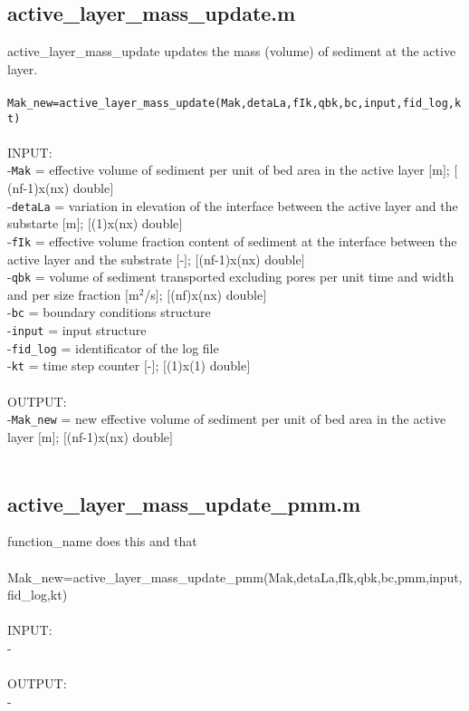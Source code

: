\subsection{active\_layer\_mass\_update.m}
active\_layer\_mass\_update updates the mass (volume) of sediment at the active layer. \\ 
 \\ 
\texttt{Mak\_new=active\_layer\_mass\_update(Mak,detaLa,fIk,qbk,bc,input,fid\_log,kt)} \\ 
 \\ 
INPUT: \\ 
   -\texttt{Mak} = effective volume of sediment per unit of bed area in the active layer $[$m$]$; $[$(nf-1)x(nx) double$]$ \\ 
   -\texttt{detaLa} = variation in elevation of the interface between the active layer and the substarte $[$m$]$; $[$(1)x(nx) double$]$ \\ 
   -\texttt{fIk} = effective volume fraction content of sediment at the interface between the active layer and the substrate $[$-$]$; $[$(nf-1)x(nx) double$]$ \\ 
   -\texttt{qbk} = volume of sediment transported excluding pores per unit time and width and per size fraction $[$m$^2$/s$]$; $[$(nf)x(nx) double$]$ \\ 
   -\texttt{bc} = boundary conditions structure  \\ 
   -\texttt{input} = input structure \\ 
   -\texttt{fid\_log} = identificator of the log file \\ 
   -\texttt{kt} = time step counter $[$-$]$; $[$(1)x(1) double$]$ \\ 
 \\ 
OUTPUT: \\ 
   -\texttt{Mak\_new} = new effective volume of sediment per unit of bed area in the active layer $[$m$]$; $[$(nf-1)x(nx) double$]$ \\ 
 \\ 
\subsection{active\_layer\_mass\_update\_pmm.m}
function\_name does this and that \\ 
 \\ 
Mak\_new=active\_layer\_mass\_update\_pmm(Mak,detaLa,fIk,qbk,bc,pmm,input,fid\_log,kt) \\ 
 \\ 
INPUT: \\ 
   - \\ 
 \\ 
OUTPUT: \\ 
   - \\ 
 \\ 
